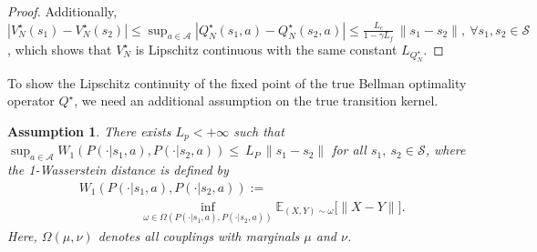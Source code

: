 \documentclass[letterpaper, 10 pt, conference]{ieeeconf}  %
\newtheorem{assumption}{Assumption}
\begin{document}
\begin{proof}
Additionally, $|V_N^\star(s_1)-V_N^\star(s_2)|
\le \sup_{a\in\mathcal A}|Q_N^\star(s_1,a)-Q_N^\star(s_2,a)|
\le \frac{L_c}{1-\gamma L_f}\,\|s_1-s_2\|,\ \forall s_1,s_2\in\mathcal S$, which shows that $V_N^\star$ is Lipschitz continuous with the same constant $L_{Q_N^\star}$.
\end{proof}

To show the Lipschitz continuity of the fixed point of the true Bellman optimality operator $Q^\star$, we need an additional assumption on the true transition kernel.
\begin{assumption}\label{ass:P1}
There exists $L_p < + \infty$ such that $\sup_{a\in\mathcal A} W_1 (P(\cdot|s_1,a), P(\cdot|s_2,a)) \le\ L_P\,\|s_1-s_2\|$ for all $s_1,\ s_2 \in \mathcal S$, where the 1-Wasserstein distance is defined by 
\begin{align*}
&W_1(P(\cdot|s_1,a), P(\cdot|s_2,a)):=\\
&\hspace{2cm}\inf_{\omega \in \Omega(P(\cdot|s_1,a), P(\cdot|s_2,a))}
\mathbb E_{(X,Y) \sim \omega} \bigl[\|X-Y\|\bigr].
\end{align*}
Here, $\Omega(\mu,\nu)$ denotes all couplings with marginals $\mu$ and $\nu$.
\end{assumption}
\end{document}
